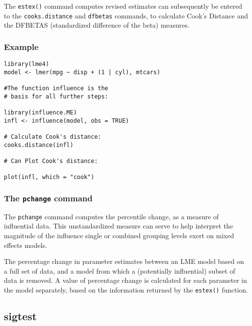 \documentclass[12pt, a4paper]{article}
\begin{document}
The \texttt{estex()} command computes revised estimates can subsequently
be entered to the \texttt{cooks.distance} and \texttt{dfbetas} commands, to calculate Cook’s Distance
and the DFBETAS (standardized difference of the beta) measures.

\subsubsection*{Example}

\begin{framed}
\begin{verbatim}
library(lme4)
model <- lmer(mpg ~ disp + (1 | cyl), mtcars)

#The function influence is the 
# basis for all further steps:

library(influence.ME)
infl <- influence(model, obs = TRUE)

# Calculate Cook's distance:
cooks.distance(infl)

# Can Plot Cook's distance:

plot(infl, which = "cook")
\end{verbatim}
\end{framed}




\subsubsection*{The \texttt{pchange} command}

The \texttt{pchange} command computes the percentile change, as a measure of influential data. This unstandardized measure can
serve to help interpret the magnitude of the influence single or combined grouping levels exert on
mixed effects models. 

The percentage change in parameter estimates between an LME model based on a full set of data, and a model from which a (potentially influential)
subset of data is removed. A value of percentage change is calculated for each parameter in the
model separately, based on the information returned by the \texttt{estex()} function.

\subsection*{sigtest}
\end{document}
